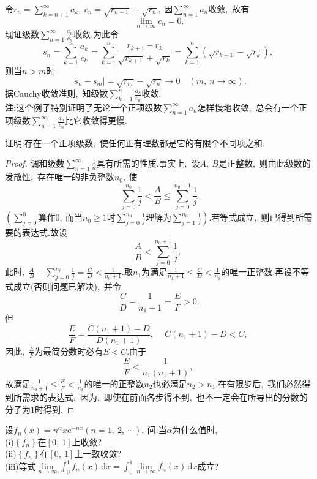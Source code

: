 	\begin{solution}
		令$r_n=\sum\limits_{k=n+1}^{\infty}a_k,\ c_n=\sqrt{r_{n-1}}+\sqrt{r_n},\ $因$\sum\limits_{n=1}^{\infty}a_n$收敛,\ 故有
		$$\lim\limits_{n\rightarrow\infty}c_n=0.$$
		现证级数$\sum\limits_{n=1}^{\infty}\frac{a_n}{c_n}$收敛.为此令
		$$s_n=\sum\limits_{k=1}^{n}\frac{a_k}{c_k}=\sum\limits_{k=1}^{n}\frac{r_{k+1}-r_k}{\sqrt{r_{k+1}}+\sqrt{r_k}}=\sum\limits_{k=1}^{n}(\sqrt{r_{k+1}}-\sqrt{r_k}),\ $$
		则当$n>m$时
		$$|s_n-s_m|=\sqrt{r_m}-\sqrt{r_n}\rightarrow0\quad(m,\ n\rightarrow\infty).$$
		据Cauchy收敛准则,\ 知级数$\sum\limits_{k=1}^{n}\frac{a_k}{c_k}$收敛.\\
		\textbf{注:}这个例子特别证明了无论一个正项级数$\sum\limits_{n=1}^{\infty}a_n$怎样慢地收敛,\ 总会有一个正项级数$\sum\limits_{n=1}^{\infty}\frac{a_n}{c_n}$比它收敛得更慢. 
	\end{solution}
	\newpage
	\begin{problem}
		证明:存在一个正项级数,\ 使任何正有理数都是它的有限个不同项之和.
	\end{problem}
	\begin{proof}
		调和级数$\sum\limits_{n=1}^{\infty}\frac{1}{n}$具有所需的性质.事实上,\ 设$A,\ B$是正整数,\ 则由此级数的发散性,\ 存在唯一的非负整数$n_0,\ $使
		$$\sum\limits_{j=0}^{n_0}\frac{1}{j}<\frac{A}{B}\le\sum\limits_{j=0}^{n_0+1}\frac{1}{j}$$
		$\left(\sum\limits_{j=0}^{0}\text{算作}0,\ \text{而当}n_0\ge1\text{时}\sum\limits_{j=0}^{n_0}\frac{1}{j}\text{理解为}\sum\limits_{j=1}^{n_0}\frac{1}{j}\right).$若等式成立,\ 则已得到所需要的表达式.故设
		$$\frac{A}{B}<\sum\limits_{j=0}^{n_0+1}\frac{1}{j},\ $$
		此时,\ $\frac{A}{B}-\sum\limits_{j=0}^{n_0}\frac{1}{j}=\frac{C}{D}<\frac{1}{n_0+1}.$取$n_1$为满足$\frac{1}{n_1+1}\le\frac{C}{D}<\frac{1}{n_1}$的唯一正整数.再设不等式成立(否则问题已解决),\ 并令
		$$\frac{C}{D}-\frac{1}{n_1+1}=\frac{E}{F}>0.$$
		但
		$$\frac{E}{F}=\frac{C(n_1+1)-D}{D(n_1+1)},\ \quad C(n_1+1)-D<C,\ $$
		因此,\ $\frac{E}{F}$为最简分数时必有$E<C.$由于
		$$\frac{E}{F}<\frac{1}{n_1(n_1+1)},\ $$
		故满足$\frac{1}{n_2+1}\le\frac{E}{F}<\frac{1}{n_2}$的唯一的正整数$n_2$也必满足$n_2>n_1.$在有限步后,\ 我们必然得到所需求的表达式,\ 因为,\ 即使在前面各步得不到,\ 也不一定会在所导出的分数的分子为$1$时得到. 
	\end{proof}
	\newpage
	\begin{problem}
		设$f_n(x)=n^\alpha x\text{e}^{-nx}(n=1,\ 2,\ \cdots),\ $问:当$\alpha$为什么值时,\ \\
		(i)$\left\{f_n\right\}$在$\left[0,\ 1\right]$上收敛?\\
		(ii)$\left\{f_n\right\}$在$\left[0,\ 1\right]$上一致收敛?\\
		(iii)等式$\lim\limits_{n\rightarrow\infty}\int_{0}^{1}f_n(x)\,\text{d}x=\int_{0}^{1}\lim\limits_{n\rightarrow\infty}f_n(x)\,\text{d}x$成立?
	\end{problem}
	
